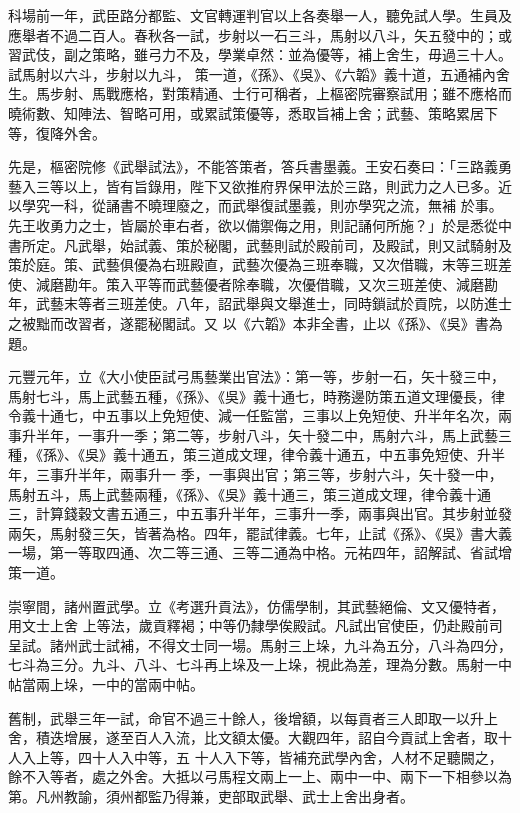 \begin{pinyinscope}
 科場前一年，武臣路分都監、文官轉運判官以上各奏舉一人，聽免試人學。生員及應舉者不過二百人。春秋各一試，步射以一石三斗，馬射以八斗，矢五發中的；或習武伎，副之策略，雖弓力不及，學業卓然：並為優等，補上舍生，毋過三十人。試馬射以六斗，步射以九斗，
 策一道，《孫》、《吳》、《六韜》義十道，五通補內舍生。馬步射、馬戰應格，對策精通、士行可稱者，上樞密院審察試用；雖不應格而曉術數、知陣法、智略可用，或累試策優等，悉取旨補上舍；武藝、策略累居下等，復降外舍。



 先是，樞密院修《武舉試法》，不能答策者，答兵書墨義。王安石奏曰：「三路義勇藝入三等以上，皆有旨錄用，陛下又欲推府界保甲法於三路，則武力之人已多。近以學究一科，從誦書不曉理廢之，而武舉復試墨義，則亦學究之流，無補
 於事。先王收勇力之士，皆屬於車右者，欲以備禦侮之用，則記誦何所施？」於是悉從中書所定。凡武舉，始試義、策於秘閣，武藝則試於殿前司，及殿試，則又試騎射及策於庭。策、武藝俱優為右班殿直，武藝次優為三班奉職，又次借職，末等三班差使、減磨勘年。策入平等而武藝優者除奉職，次優借職，又次三班差使、減磨勘年，武藝末等者三班差使。八年，詔武舉與文舉進士，同時鎖試於貢院，以防進士之被黜而改習者，遂罷秘閣試。又
 以《六韜》本非全書，止以《孫》、《吳》書為題。



 元豐元年，立《大小使臣試弓馬藝業出官法》：第一等，步射一石，矢十發三中，馬射七斗，馬上武藝五種，《孫》、《吳》義十通七，時務邊防策五道文理優長，律令義十通七，中五事以上免短使、減一任監當，三事以上免短使、升半年名次，兩事升半年，一事升一季；第二等，步射八斗，矢十發二中，馬射六斗，馬上武藝三種，《孫》、《吳》義十通五，策三道成文理，律令義十通五，中五事免短使、升半年，三事升半年，兩事升一
 季，一事與出官；第三等，步射六斗，矢十發一中，馬射五斗，馬上武藝兩種，《孫》、《吳》義十通三，策三道成文理，律令義十通三，計算錢穀文書五通三，中五事升半年，三事升一季，兩事與出官。其步射並發兩矢，馬射發三矢，皆著為格。四年，罷試律義。七年，止試《孫》、《吳》書大義一場，第一等取四通、次二等三通、三等二通為中格。元祐四年，詔解試、省試增策一道。



 崇寧間，諸州置武學。立《考選升貢法》，仿儒學制，其武藝絕倫、文又優特者，用文士上舍
 上等法，歲貢釋褐；中等仍隸學俟殿試。凡試出官使臣，仍赴殿前司呈試。諸州武士試補，不得文士同一場。馬射三上垛，九斗為五分，八斗為四分，七斗為三分。九斗、八斗、七斗再上垛及一上垛，視此為差，理為分數。馬射一中帖當兩上垛，一中的當兩中帖。



 舊制，武舉三年一試，命官不過三十餘人，後增額，以每貢者三人即取一以升上舍，積迭增展，遂至百人入流，比文額太優。大觀四年，詔自今貢試上舍者，取十人入上等，四十人入中等，五
 十人入下等，皆補充武學內舍，人材不足聽闕之，餘不入等者，處之外舍。大抵以弓馬程文兩上一上、兩中一中、兩下一下相參以為第。凡州教諭，須州都監乃得兼，吏部取武舉、武士上舍出身者。




\end{pinyinscope}
